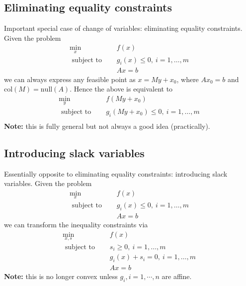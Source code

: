 \documentclass[a4paper]{article}
\begin{document}
{\subsection{Eliminating equality constraints}
Important special case of change of variables: eliminating equality constraints. Given the problem 
\begin{equation}
  \begin{array}{ll}
    \min\limits_{x} & \quad f(x)  \\
    \text { subject to } &\quad g_{i}(x)\leq 0, \ i=1, \ldots, m \\ \nonumber
    & \quad Ax = b
\end{array}
\end{equation}
we can always express any feasible point as $x = My + x_0$, where $Ax_0 = b$ and $\text{col}(M) = \text{null}(A)$. Hence the above is equivalent to 
\begin{equation}
  \begin{array}{ll}
    \min\limits_{y} & \quad f(My + x_0)  \\
    \text { subject to } &\quad g_{i}(My + x_0)\leq 0, \ i=1, \ldots, m \\ \nonumber
\end{array}
\end{equation}
\textbf{Note:} this is fully general but not always a good idea (practically).

\subsection{Introducing slack variables}
Essentially opposite to eliminating equality constraints: introducing slack variables. Given the problem
\begin{equation}
  \begin{array}{ll}
    \min\limits_{x} & \quad f(x)  \\
    \text { subject to } &\quad g_{i}(x)\leq 0, \ i=1, \ldots, m \\ \nonumber
    & \quad Ax = b
\end{array}
\end{equation}
we can transform the inequality constraints via
\begin{equation}
  \begin{array}{ll}
    \min\limits_{x, s} & \quad f(x)  \\
    \text { subject to } & \quad s_i \geq 0, \ i=1, \ldots, m \\ \nonumber
    & \quad g_{i}(x) + s_i = 0, \ i=1, \ldots, m \\
    & \quad Ax = b
\end{array}
\end{equation}
\textbf{Note:} this is no longer convex unless $g_i, i= 1, \cdots, n$ are affine.

}
\end{document}
